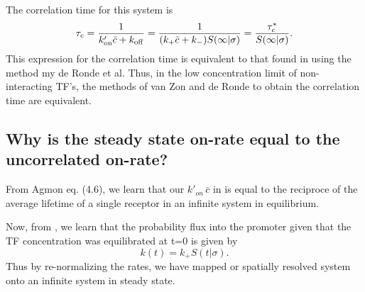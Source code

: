 The correlation time for this system is
\begin{equation}
 \tau_c = \frac{1}{k'_{\rm on} \bar{c} + k_{\rm off}} = \frac{1}{ (k_+ \bar{c} + k_- ) S(\infty|\sigma) } = \frac{\tau_c^*}{S(\infty|\sigma)}.
\end{equation}
This expression for the correlation time is equivalent to that found in  using the method my de Ronde et al. Thus, in the low concentration limit of non-interacting TF's, the methods of van Zon and de Ronde to obtain the correlation time are equivalent.

\subsection{Why is the steady state on-rate equal to the uncorrelated on-rate?}


From Agmon \cite{Agmon1990} eq. (4.6), we learn that our $k'_{on} \, \bar{c}$ in  is equal to the reciproce of the average lifetime of a single receptor in an infinite system in equilibrium.

Now, from \cite{Agmon1990}, we learn that the probability flux into the promoter given that the TF concentration was equilibrated at t=0 is given by
\begin{equation}
 k(t) = k_+ S(t|\sigma).
\end{equation}
Thus by re-normalizing the rates, we have mapped or spatially resolved system onto an infinite system in steady state.